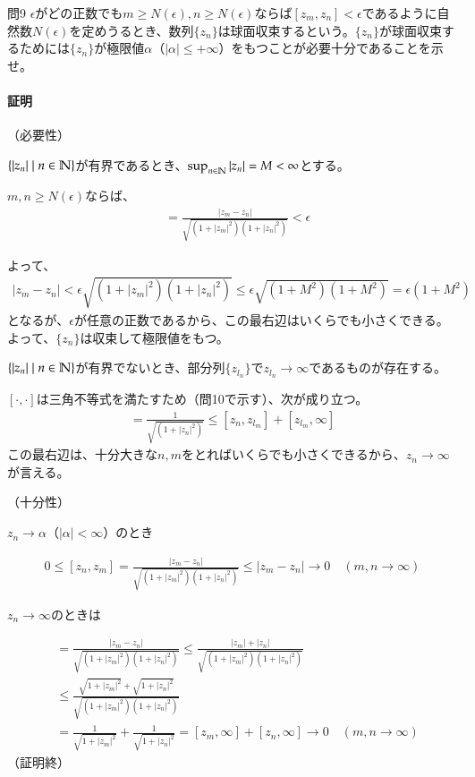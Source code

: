 \newpage
\begin{mysimplebox}{問9}
    $\epsilon$がどの正数でも$m\ge N(\epsilon),n\ge N(\epsilon)$ならば$[z_m,z_n]<\epsilon$であるように自然数$N(\epsilon)$を定めうるとき、数列$\{z_n\}$は球面収束するという。$\{z_n\}$が球面収束するためには$\{z_n\}$が極限値$\alpha$（$|\alpha|\le+\infty$）をもつことが必要十分であることを示せ。
\end{mysimplebox}
\paragraph{証明}
（必要性）

$\{|z_n|\mid n\in\mathbb{N}\}$が有界であるとき、$\sup_{n\in\mathbb{N}}|z_n|=M<\infty$とする。

$m,n\ge N(\epsilon)$ならば、
\begin{align*}
    [z_m,z_n]
    &=\frac{|z_m-z_n|}{\sqrt{(1+|z_m|^2)(1+|z_n|^2)}}
    <\epsilon
\end{align*}

よって、
\begin{align*}
    |z_m-z_n|<\epsilon\sqrt{(1+|z_m|^2)(1+|z_n|^2)}
    \le\epsilon\sqrt{(1+M^2)(1+M^2)}=\epsilon(1+M^2)
\end{align*}
となるが、$\epsilon$が任意の正数であるから、この最右辺はいくらでも小さくできる。よって、$\{z_n\}$は収束して極限値をもつ。

$\{|z_n|\mid n\in\mathbb{N}\}$が有界でないとき、部分列$\{z_{l_n}\}$で$z_{l_n}\longrightarrow\infty$であるものが存在する。

$[\cdot,\cdot]$は三角不等式を満たすため（問10で示す）、次が成り立つ。
\begin{align*}
    [z_n,\infty]
    =\frac{1}{\sqrt{(1+|z_n|^2)}}
    \le[z_n,z_{l_m}]+[z_{l_m},\infty]
\end{align*}
この最右辺は、十分大きな$n,m$をとればいくらでも小さくできるから、$z_n\longrightarrow\infty$が言える。

（十分性）

$z_n\longrightarrow\alpha$（$|\alpha|<\infty$）のとき

\begin{align*}
    0\le[z_n,z_m]
    =\frac{|z_m-z_n|}{\sqrt{(1+|z_m|^2)(1+|z_n|^2)}}
    \le|z_m-z_n|\longrightarrow0\quad(m,n\longrightarrow\infty)
\end{align*}

$z_n\longrightarrow\infty$のときは

\begin{align*}
    [z_m,z_n]
    &=\frac{|z_m-z_n|}{\sqrt{(1+|z_m|^2)(1+|z_n|^2)}}
    \le\frac{|z_m|+|z_n|}{\sqrt{(1+|z_m|^2)(1+|z_n|^2)}}\\
    &\le\frac{\sqrt{1+|z_m|^2}+\sqrt{1+|z_n|^2}}{\sqrt{(1+|z_m|^2)(1+|z_n|^2)}}\\
    &=\frac{1}{\sqrt{1+|z_m|^2}}+\frac{1}{\sqrt{1+|z_n|^2}}
    =[z_m,\infty]+[z_n,\infty]\longrightarrow0
    \quad(m,n\longrightarrow\infty)
\end{align*}
（証明終）
\newpage
